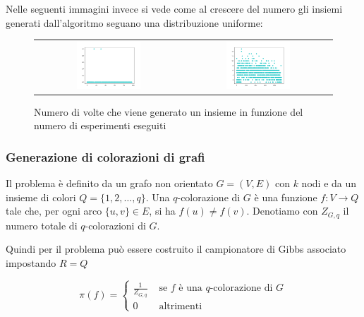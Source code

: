 \documentclass{article}
\begin{document}
Nelle seguenti immagini invece si vede come al crescere del numero gli insiemi generati dall'algoritmo seguano una distribuzione uniforme:
\begin{figure}[htbp]
    \centering
    \begin{tabular}{cc}
        \includegraphics[width=0.45\textwidth]{img/grafico_indipendent_set_100_100.png} &
        \includegraphics[width=0.45\textwidth]{img/grafico_indipendent_set_5000_100.png}
    \end{tabular}
    \caption{Numero di volte che viene generato un insieme in funzione del numero di esperimenti eseguiti}
\end{figure}

\newpage
\subsubsection{Generazione di colorazioni di grafi}

Il problema è definito da un grafo non orientato $ G = (V, E) $ con $ k $ nodi e da un insieme di colori $ Q = \{1, 2, \ldots, q\} $. Una $ q $-colorazione di $ G $ è una funzione $ f : V \rightarrow Q $ tale che, per ogni arco $ \{u, v\} \in E $, si ha $ f(u) \neq f(v) $. Denotiamo con $ Z_{G,q} $ il numero totale di $ q $-colorazioni di $ G $.

Quindi per il problema può essere costruito il campionatore di Gibbs associato impostando $R = Q$ 

\begin{equation}
    \pi(f)=\left\{\begin{array}{ll}
\frac{1}{Z_{G, q}} & \text { se } f \text { è una } q \text {-colorazione di } G \\
0 & \text { altrimenti }
\end{array}\right.
\end{equation}
\end{document}
